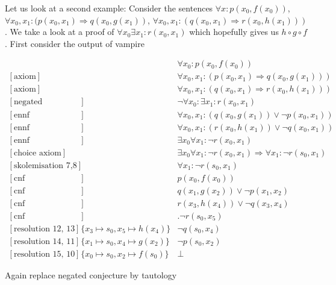 \documentclass[onehalfspacing]{article}
\begin{document}
Let us look at a second example: Consider the sentences $\forall x : p(x_0, f(x_0))$, $\forall x_0, x_1: (p(x_0, x_1)\Rightarrow q(x_0, g(x_1))$, $\forall x_0, x_1: (q(x_0, x_1)\Rightarrow r(x_0, h(x_1)))$. We take a look at a proof of $\forall x_0\exists x_1: r(x_0, x_1)$ which hopefully gives us $h\circ g\circ f$. First consider the output of vampire

\setcounter{equation}{0}
\begin{align}
	[\text{axiom}] && \forall x_0: p(x_0,f(x_0))\\
	[\text{axiom}] && \forall x_0, x_1 : (p(x_0,x_1) \Rightarrow q(x_0,g(x_1)))\\
	[\text{axiom}] && \forall x_0, x_1 : (q(x_0,x_1) \Rightarrow r(x_0,h(x_1)))\\
	[\text{negated conjecture}] &&\neg\forall  x_0 : \exists x_1 : r(x_0,x_1)\\
	[\text{ennf transformation 2}] && \forall x_0, x_1 : (q(x_0,g(x_1)) \vee \neg p(x_0,x_1)) \\
	[\text{ennf transformation 3}] &&\forall x_0, x_1 : (r(x_0,h(x_1)) \vee \neg q(x_0, x_1)) \\
	[\text{ennf transformation 4}] && \exists x_0 \forall x_1 : \neg r(x_0, x_1)\\
	[\text{choice axiom}] && \exists x_0 \forall x_1 : \neg r(x_0, x_1) \Rightarrow \forall x_1 : \neg r(s_0,x_1)\\
	[\text{skolemisation 7,8}] && \forall x_1 : \neg r(s_0, x_1)\\
	[\text{cnf transformation 1}] && p(x_0,f(x_0))\\
	[\text{cnf transformation 5}] && q(x_1,g(x_2)) \vee \neg p(x_1, x_2)\\
	[\text{cnf transformation 6}] && r(x_3,h(x_4)) \vee \neg q(x_3, x_4)\\
	[\text{cnf transformation 9}] &&. \neg r(s_0,x_5)\\
	[\text{resolution 12, 13}] &\{x_3\mapsto s_0, x_5\mapsto h(x_4)\}& \neg q(s_0,x_4)\\
	[\text{resolution 14, 11}] &\{x_1\mapsto s_0, x_4\mapsto g(x_2)\}&\neg p(s_0,x_2)\\
	[\text{resolution 15, 10}] &\{x_0\mapsto s_0, x_2\mapsto f(s_0)\}& \bot
\end{align}

Again replace negated conjecture by tautology
\end{document}
